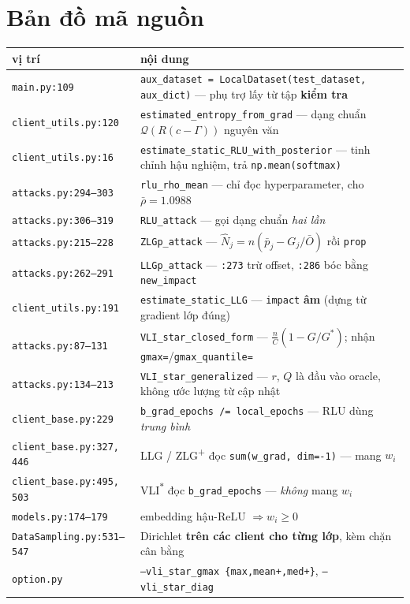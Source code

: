 \documentclass[11pt,a4paper]{article}
\theoremstyle{remark}
\newcommand{\quant}{\mathcal{Q}}
\newcommand{\code}[1]{\texttt{\small #1}}
\begin{document}
\section{Bản đồ mã nguồn}

\begin{table}[htbp]
\centering
\small
\begin{tabular}{@{}p{5.6cm}p{9.2cm}@{}}
\toprule
\textbf{vị trí} & \textbf{nội dung} \\
\midrule
\code{main.py:109} & \code{aux\_dataset = LocalDataset(test\_dataset, aux\_dict)} --- phụ trợ lấy từ tập \textbf{kiểm tra} \\
\code{client\_utils.py:120} & \code{estimated\_entropy\_from\_grad} --- dạng chuẩn $\quant(R(c-\Gamma))$ nguyên văn \\
\code{client\_utils.py:16} & \code{estimate\_static\_RLU\_with\_posterior} --- tinh chỉnh hậu nghiệm, trả \code{np.mean(softmax)} \\
\code{attacks.py:294--303} & \code{rlu\_rho\_mean} --- chỉ đọc hyperparameter, cho $\bar\rho=1.0988$ \\
\code{attacks.py:306--319} & \code{RLU\_attack} --- gọi dạng chuẩn \emph{hai lần} \\
\code{attacks.py:215--228} & \code{ZLGp\_attack} --- $\hat N_j=n(\bar p_j-G_j/\bar O)$ rồi \code{prop} \\
\code{attacks.py:262--291} & \code{LLGp\_attack} --- \code{:273} trừ offset, \code{:286} bóc bằng \code{new\_impact} \\
\code{client\_utils.py:191} & \code{estimate\_static\_LLG} --- \code{impact} \textbf{âm} (dựng từ gradient lớp đúng) \\
\code{attacks.py:87--131} & \code{VLI\_star\_closed\_form} --- $\frac nC(1-G/G^*)$; nhận \code{gmax=}/\code{gmax\_quantile=} \\
\code{attacks.py:134--213} & \code{VLI\_star\_generalized} --- $r$, $Q$ là đầu vào oracle, không ước lượng từ cập nhật \\
\code{client\_base.py:229} & \code{b\_grad\_epochs /= local\_epochs} --- RLU dùng \emph{trung bình} \\
\code{client\_base.py:327, 446} & LLG / ZLG\textsuperscript{+} đọc \code{sum(w\_grad, dim=-1)} --- mang $w_i$ \\
\code{client\_base.py:495, 503} & VLI\textsuperscript{$*$} đọc \code{b\_grad\_epochs} --- \emph{không} mang $w_i$ \\
\code{models.py:174--179} & embedding hậu-ReLU $\Rightarrow w_i\ge0$ \\
\code{DataSampling.py:531--547} & Dirichlet \textbf{trên các client cho từng lớp}, kèm chặn cân bằng \\
\code{option.py} & \code{--vli\_star\_gmax \{max,mean+,med+\}}, \code{--vli\_star\_diag} \\
\bottomrule
\end{tabular}
\end{table}
\end{document}
